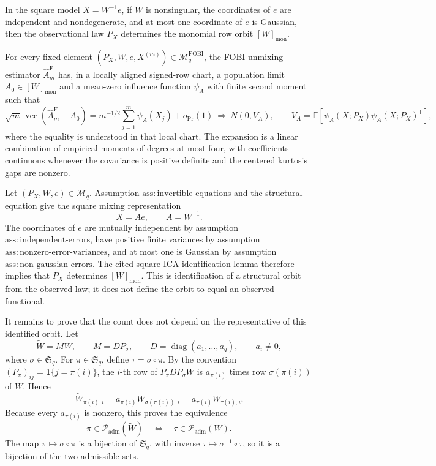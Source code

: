 In the square model \(X=W^{-1}e\), if \(W\) is nonsingular, the coordinates of \(e\) are independent and nondegenerate, and at most one coordinate of \(e\) is Gaussian, then the observational law \(P_X\) determines the monomial row orbit \([W]_{\mathrm{mon}}\).

For every fixed element \((P_X,W,e,X^{(m)})\in\mathcal M_q^{\mathrm{FOBI}}\), the FOBI unmixing estimator \(\widehat A_m^{\mathrm F}\) has, in a locally aligned signed-row chart, a population limit \(A_0\in[W]_{\mathrm{mon}}\) and a mean-zero influence function \(\psi_A\) with finite second moment such that
\[
 \sqrt m\,\operatorname{vec}(\widehat A_m^{\mathrm F}-A_0)
 =m^{-1/2}\sum_{j=1}^m\psi_A(X_j)+o_{\Pr}(1)
 \ \Longrightarrow\ N(0,V_A),
 \qquad
 V_A=\mathbb E[\psi_A(X;P_X)\psi_A(X;P_X)^{\mathsf T}],
\]
where the equality is understood in that local chart. The expansion is a linear combination of empirical moments of degrees at most four, with coefficients continuous whenever the covariance is positive definite and the centered kurtosis gaps are nonzero.

Let \((P_X,W,e)\in\mathcal M_q\). Assumption \(\mathrm{ass:invertible\mbox{-}equations}\) and the structural equation give the square mixing representation
\[
 X=Ae,\qquad A=W^{-1}.
\]
The coordinates of \(e\) are mutually independent by assumption \(\mathrm{ass:independent\mbox{-}errors}\), have positive finite variances by assumption \(\mathrm{ass:nonzero\mbox{-}error\mbox{-}variances}\), and at most one is Gaussian by assumption \(\mathrm{ass:non\mbox{-}gaussian\mbox{-}errors}\). The cited square-ICA identification lemma therefore implies that \(P_X\) determines \([W]_{\mathrm{mon}}\). This is identification of a structural orbit from the observed law; it does not define the orbit to equal an observed functional.

It remains to prove that the count does not depend on the representative of this identified orbit. Let
\[
 \widetilde W=MW,
 \qquad
 M=D P_\sigma,
 \qquad
 D=\operatorname{diag}(a_1,\ldots,a_q),
 \qquad a_i\neq0,
\]
where \(\sigma\in\mathfrak S_q\). For \(\pi\in\mathfrak S_q\), define \(\tau=\sigma\circ\pi\). By the convention \((P_\pi)_{ij}=\mathbf 1\{j=\pi(i)\}\), the \(i\)-th row of \(P_\pi D P_\sigma W\) is \(a_{\pi(i)}\) times row \(\sigma(\pi(i))\) of \(W\). Hence
\[
 \widetilde W_{\pi(i),i}
 =a_{\pi(i)}W_{\sigma(\pi(i)),i}
 =a_{\pi(i)}W_{\tau(i),i}.
\]
Because every \(a_{\pi(i)}\) is nonzero, this proves the equivalence
\[
 \pi\in\mathcal P_{\mathrm{adm}}(\widetilde W)
 \quad\Longleftrightarrow\quad
 \tau\in\mathcal P_{\mathrm{adm}}(W).
\]
The map \(\pi\mapsto\sigma\circ\pi\) is a bijection of \(\mathfrak S_q\), with inverse \(\tau\mapsto\sigma^{-1}\circ\tau\), so it is a bijection of the two admissible sets.

